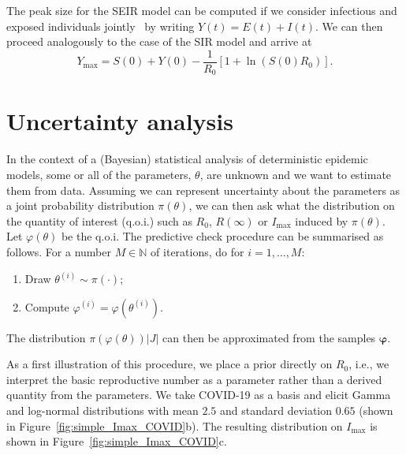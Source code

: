 \documentclass[a4paper, notitlepage, 10pt]{article}
\begin{document}
The peak size for the SEIR model can be computed if we consider infectious and exposed individuals jointly~\citep{Feng2007} by writing $Y(t) = E(t) + I(t)$.
We can then proceed analogously to the case of the SIR model and arrive at 
\begin{equation}
 \label{eq:Ymax}
 Y_{\max} = S(0) + Y(0) - \frac{1}{R_0} \left[1 + \ln(S(0)R_0)\right].
\end{equation}

\section*{Uncertainty analysis}

In the context of a (Bayesian) statistical analysis of deterministic epidemic models, some or all of the parameters, $\theta$, are unknown and we want to estimate them from data.
Assuming we can represent uncertainty about the parameters as a joint probability distribution $\pi(\theta)$, we can then ask what the distribution on the quantity of interest (q.o.i.) such as $R_0$, $R(\infty)$ or $I_{\max}$ induced by $\pi(\theta)$.
Let $\varphi(\theta)$ be the q.o.i.
The predictive check procedure can be summarised as follows.
For a number $M \in \mathbb{N}$ of iterations, do for $i = 1, \ldots, M$:
\begin{enumerate}
 \item Draw $\theta^{(i)} \sim \pi(\cdot)$;
 \item Compute $\varphi^{(i)} = \varphi(\theta^{(i)})$.
\end{enumerate}
The distribution $\pi(\varphi(\theta))|J|$ can then be approximated from the samples $\boldsymbol\varphi$.

As a first illustration of this procedure, we place a prior directly on $R_0$, i.e., we interpret the basic reproductive number as a parameter rather than a derived quantity from the parameters.
We take COVID-19 as a basis and elicit Gamma and log-normal distributions with mean $2.5$ and standard deviation $0.65$ (shown in Figure~\ref{fig:simple_Imax_COVID}b).
The resulting distribution on $I_{\max}$ is shown in Figure~\ref{fig:simple_Imax_COVID}c.
\end{document}
